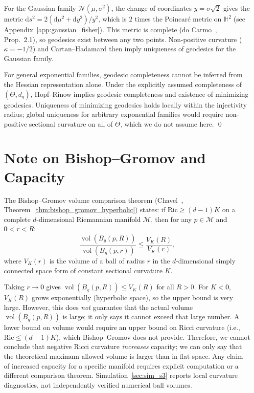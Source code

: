 \documentclass[a4paper,fleqn]{cas-dc}
\DeclareMathOperator{\vol}{vol}
\newcommand{\calM}{\mathcal{M}}
\begin{document}
For the Gaussian family $\mathcal{N}(\mu,\sigma^2)$, the change of
coordinates $y = \sigma\sqrt{2}$ gives the metric
$\mathrm{d}s^2 = 2(\mathrm{d}\mu^2 + \mathrm{d}y^2)/y^2$, which is
$2$ times the Poincar\'{e} metric on $\mathbb{H}^2$ (see
Appendix~\ref{app:gaussian_fisher}).  This metric is complete (do
Carmo~\cite{do2002riemannian}, Prop.~2.1), so geodesics exist
between any two points.  Non-positive curvature ($\kappa=-1/2$)
and Cartan--Hadamard then imply uniqueness of geodesics for the
Gaussian family.

For general exponential families, geodesic completeness cannot be
inferred from the Hessian representation alone. Under the explicitly
assumed completeness of $(\Theta,d_g)$, Hopf--Rinow implies geodesic
completeness and existence of minimizing geodesics.  Uniqueness of minimizing geodesics holds locally within
the injectivity radius; global uniqueness for arbitrary exponential
families would require non-positive sectional curvature on all of
$\Theta$, which we do not assume here.  \qed

\section{Note on Bishop--Gromov and Capacity}
\label{app:bishop_gromov_corrected}

The Bishop--Gromov volume comparison theorem (Chavel~\cite{chavel2006riemannian},
Theorem~\ref{thm:bishop_gromov_hyperbolic}) states: if $\mathrm{Ric} \geq (d-1)K$ on a complete
$d$-dimensional Riemannian manifold $\calM$, then for any $p \in \calM$
and $0 < r < R$:
\[
  \frac{\vol(B_g(p, R))}{\vol(B_g(p, r))} \leq \frac{V_K(R)}{V_K(r)},
\]
where $V_K(r)$ is the volume of a ball of radius $r$ in the
$d$-dimensional simply connected space form of constant sectional
curvature $K$.

Taking $r \to 0$ gives $\vol(B_g(p,R)) \leq V_K(R)$ for all $R>0$.
For $K<0$, $V_K(R)$ grows exponentially (hyperbolic space), so the
upper bound is very large.  However, this does \emph{not} guarantee that
the actual volume $\vol(B_g(p,R))$ is large; it only says it cannot
exceed that large number.  A lower bound on volume would require an
upper bound on Ricci curvature (i.e., $\mathrm{Ric} \leq (d-1)K$),
which Bishop–Gromov does not provide.  Therefore, we cannot conclude
that negative Ricci curvature \emph{increases} capacity; we can only say
that the theoretical maximum allowed volume is larger than in flat space.
Any claim of increased capacity for a specific manifold requires
explicit computation or a different comparison theorem.
Simulation~\ref{sec:sim_s3} reports local curvature diagnostics, not
independently verified numerical ball volumes.
\end{document}
